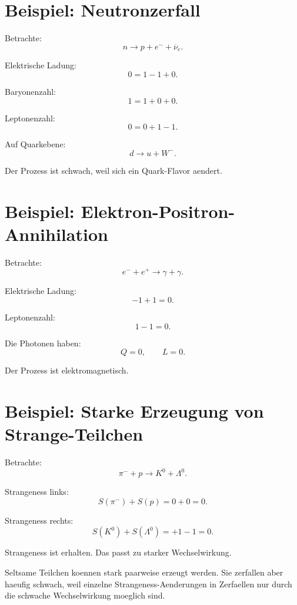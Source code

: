 \section{Beispiel: Neutronzerfall}

\begin{examplebox}
Betrachte:
\[
    n \rightarrow p + e^- + \overline{\nu}_e.
\]

Elektrische Ladung:
\[
    0 = 1 - 1 + 0.
\]

Baryonenzahl:
\[
    1 = 1 + 0 + 0.
\]

Leptonenzahl:
\[
    0 = 0 + 1 - 1.
\]

Auf Quarkebene:
\[
    d \rightarrow u + W^-.
\]

Der Prozess ist schwach, weil sich ein Quark-Flavor aendert.
\end{examplebox}

\section{Beispiel: Elektron-Positron-Annihilation}

\begin{examplebox}
Betrachte:
\[
    e^- + e^+ \rightarrow \gamma + \gamma.
\]

Elektrische Ladung:
\[
    -1+1=0.
\]

Leptonenzahl:
\[
    1-1=0.
\]

Die Photonen haben:
\[
    Q=0,
    \qquad
    L=0.
\]

Der Prozess ist elektromagnetisch.
\end{examplebox}

\section{Beispiel: Starke Erzeugung von Strange-Teilchen}

\begin{examplebox}
Betrachte:
\[
    \pi^- + p \rightarrow K^0 + \Lambda^0.
\]

Strangeness links:
\[
    S(\pi^-)+S(p)=0+0=0.
\]

Strangeness rechts:
\[
    S(K^0)+S(\Lambda^0)=+1-1=0.
\]

Strangeness ist erhalten.
Das passt zu starker Wechselwirkung.
\end{examplebox}

\begin{conceptbox}
Seltsame Teilchen koennen stark paarweise erzeugt werden.
Sie zerfallen aber haeufig schwach, weil einzelne Strangeness-Aenderungen in
Zerfaellen nur durch die schwache Wechselwirkung moeglich sind.
\end{conceptbox}

